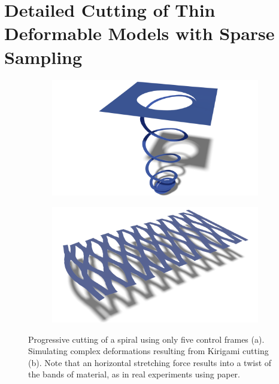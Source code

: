 \chapter[Detailed Cutting with Sparse Sampling]{Detailed Cutting of Thin Deformable Models with Sparse Sampling}
\label{chap:cutting}
\begin{figure}[t]
\centering
\begin{subfigure}[b]{0.45\linewidth}
\includegraphics[width=\linewidth]{images/cutting-mig2015/Spiral2.pdf}
\caption{\label{fig:spiral}}
\end{subfigure}
\hfill
\begin{subfigure}[b]{0.45\linewidth}
\includegraphics[width=\linewidth]{images/cutting-mig2015/Kirigami.pdf}
\caption{\label{fig:kirigami}}
\end{subfigure}
\caption[Frame-based cutting: Spiral and Kirigami cutting examples]{\label{fig:Cutting_Teaser} Progressive cutting of a spiral using only five control frames (a). Simulating complex deformations resulting from Kirigami cutting (b). Note that an horizontal stretching force results into a twist of the bands of material, as in real experiments using paper.}
\end{figure}
